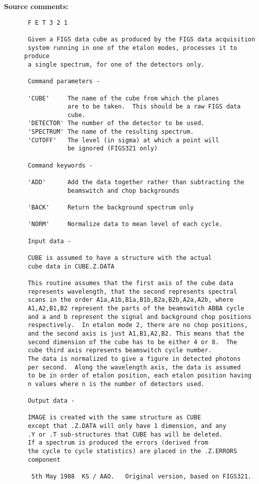 \begin{description}
\item [{\bf Source comments:}]
\begin{verbatim}
 F E T 3 2 1

 Given a FIGS data cube as produced by the FIGS data acquisition
 system running in one of the etalon modes, processes it to produce
 a single spectrum, for one of the detectors only.

 Command parameters -

 'CUBE'     The name of the cube from which the planes
            are to be taken.  This should be a raw FIGS data
            cube.
 'DETECTOR' The number of the detector to be used.
 'SPECTRUM' The name of the resulting spectrum.
 'CUTOFF'   The level (in sigma) at which a point will
            be ignored (FIGS321 only)

 Command keywords -

 'ADD'      Add the data together rather than subtracting the
            beamswitch and chop backgrounds

 'BACK'     Return the background spectrum only

 'NORM'     Normalize data to mean level of each cycle.

 Input data -

 CUBE is assumed to have a structure with the actual
 cube data in CUBE.Z.DATA

 This routine assumes that the first axis of the cube data
 represents wavelength, that the second represents spectral
 scans in the order A1a,A1b,B1a,B1b,B2a,B2b,A2a,A2b, where
 A1,A2,B1,B2 represent the parts of the beamswitch ABBA cycle
 and a and b represent the signal and background chop positions
 respectively.  In etalon mode 2, there are no chop positions,
 and the second axis is just A1,B1,A2,B2. This means that the
 second dimension of the cube has to be either 4 or 8.  The
 cube third axis represents beamswitch cycle number.
 The data is normalized to give a figure in detected photons
 per second.  Along the wavelength axis, the data is assumed
 to be in order of etalon position, each etalon position having
 n values where n is the number of detectors used.

 Output data -

 IMAGE is created with the same structure as CUBE
 except that .Z.DATA will only have 1 dimension, and any
 .Y or .T sub-structures that CUBE has will be deleted.
 If a spectrum is produced the errors (derived from
 the cycle to cycle statistics) are placed in the .Z.ERRORS
 component

  5th May 1988  KS / AAO.   Original version, based on FIGS321.
\end{verbatim}
\end{description}
